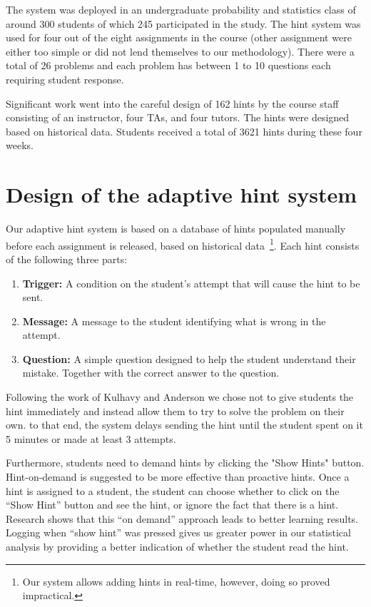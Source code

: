 \documentclass{llncs2e/llncs}
\begin{document}
The system was deployed in an undergraduate probability and statistics class of around 300 students of which 245 participated in the study. The hint system was used for four out of the eight assignments in the course (other assignment were either too simple or did not lend themselves to our methodology). There were a total of 26 problems and each problem has between 1 to 10 questions each requiring student response.

Significant work went into the careful design of 162 hints by the course staff consisting of an instructor, four TAs, and four tutors. The hints were designed based on historical data. Students received a total of 3621 hints during these four weeks.

\section{Design of the adaptive hint system}

Our adaptive hint system is based on a database of hints populated manually before each assignment is released, based on historical data~\footnote{Our system allows adding hints in real-time, however, doing so proved impractical.}. Each hint consists of the following three parts:
\begin{enumerate}
\item {\bf Trigger:} A condition on the student's attempt that will cause the hint to be sent.
\item {\bf Message:} A message to the student identifying what is wrong in the attempt.
\item {\bf Question:} A simple question designed to help the student understand their mistake. Together with the correct answer to the question.   
\end{enumerate}


Following the work of Kulhavy and Anderson\cite{Kulhavy1972} we chose
not to give students the hint immediately and instead allow them to
try to solve the problem on their own. to that end, the system delays
sending the hint until the student spent on it 5 minutes or made at
least 3 attempts.

Furthermore, students need to demand hints by clicking the "Show
Hints" button. Hint-on-demand is suggested to be more effective than
proactive hints\cite{Razzaq2010}. Once a hint is assigned to a
student, the student can choose whether to click on the ``Show Hint''
button and see the hint, or ignore the fact that there is a hint.
Research shows that this ``on demand'' approach leads to better
learning results. Logging when ``show hint'' was pressed gives us
greater power in our statistical analysis by providing a better
indication of whether the student read the hint.
\end{document}
